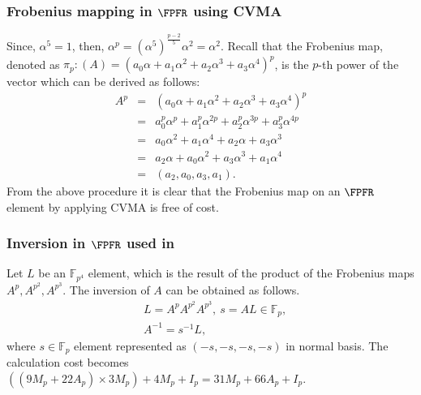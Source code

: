 \subsubsection{Frobenius mapping in $\FPFR$ using CVMA}
Since, $\alpha^5=1$, then, $\alpha^p=(\alpha^5)^{\frac{p-2}{5} }\alpha^2=\alpha^2$. 
Recall that the Frobenius map, denoted as $\pi_p : (A) = (a_0 \alpha +a_1\alpha^2+a_2\alpha^3+a_3\alpha^4)^p$, is the $p$-th power of the vector which can be derived as follows:
\begin{eqnarray}
	A^p & = & (a_0\alpha+ a_1\alpha^2 + a_2\alpha^3 +a_3\alpha^4)^p \nonumber\\ 
	    & = & a_0^p\alpha^p+ a_1^p\alpha^{2p} + a_2^p\alpha^{3p} +a_3^p\alpha^{4p}\nonumber\\ 
	    & = & a_0\alpha^2+ a_1\alpha^{4} + a_2\alpha +a_3\alpha^{3}\nonumber \\ 
		& = & a_2\alpha+ a_0\alpha^{2} + a_3\alpha^3 +a_1\alpha^{4} \nonumber \\ 
		& = & (a_2, a_0, a_3,a_1) \label{fp4frob}.
\end{eqnarray}
From the above procedure it is clear that the Frobenius map on an $\FPFR$ element by applying CVMA is free of cost.

\subsubsection{Inversion in $\FPFR$ used in \cite{cvma_sanada}}
Let $L$ be an $\mathbb{F}_{p^4}$ element, which is the result of the product of the Frobenius maps $A^p, A^{p^2}, A^{p^3}$.
The inversion of $A$ can be obtained as follows.
\begin{eqnarray}
&L=A^p A^{p^2} A^{p^3}, ~ s=AL \in \mathbb{F}_p, \nonumber \\
&A^{-1}=s^{-1}L, \nonumber
\end{eqnarray}
where $s \in \mathbb{F}_p$ element represented as $(-s,-s,-s,-s)$ in normal basis.
The calculation cost becomes $((9M_p+22A_p)\times3M_p)+4M_p+I_p=31M_p+66A_p+I_p$.
